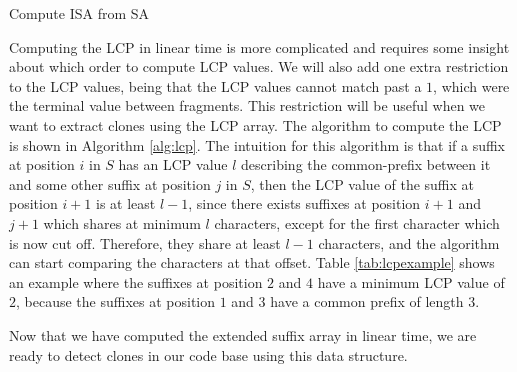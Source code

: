 \begin{algorithm}[t]
  \SetAlgoLined\DontPrintSemicolon

  \vspace{0.5cm}
  \caption{Compute ISA from SA}
  \label{alg:isa}
\end{algorithm}


Computing the LCP in linear time is more complicated and requires some insight about which
order to compute LCP values. We will also add one extra restriction to the LCP values,
being that the LCP values cannot match past a $1$, which were the terminal value between
fragments. This restriction will be useful when we want to extract clones using the LCP
array. The algorithm to compute the LCP is shown in Algorithm \ref{alg:lcp}.  The
intuition for this algorithm is that if a suffix at position $i$ in $S$ has an LCP value
$l$ describing the common-prefix between it and some other suffix at position $j$ in $S$,
then the LCP value of the suffix at position $i + 1$ is at least $l - 1$, since there
exists suffixes at position $i + 1$ and $j + 1$ which shares at minimum $l$ characters,
except for the first character which is now cut off. Therefore, they share at least $l -
1$ characters, and the algorithm can start comparing the characters at that offset. Table
\ref{tab:lcpexample} shows an example where the suffixes at position $2$ and $4$ have a
minimum LCP value of $2$, because the suffixes at position $1$ and $3$ have a common
prefix of length $3$.

Now that we have computed the extended suffix array in linear time, we are ready to detect
clones in our code base using this data structure.

